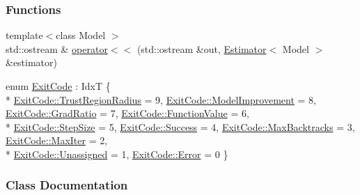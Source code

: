 \subsubsection*{Functions}
\begin{DoxyCompactItemize}
\item 
{\footnotesize template$<$class Model $>$ }\\std\+::ostream \& \hyperlink{namespacemappel_1_1estimator_a8267d0998b3d27a8c40bf1fe9227113d}{operator$<$$<$} (std\+::ostream \&out, \hyperlink{classmappel_1_1estimator_1_1Estimator}{Estimator}$<$ Model $>$ \&estimator)
\end{DoxyCompactItemize}
\begin{DoxyCompactItemize}
\item 
enum \hyperlink{namespacemappel_1_1estimator_ae49999202b8a1968bc308aa30ac24e6c}{Exit\+Code} \+: IdxT \{ \\*
\hyperlink{namespacemappel_1_1estimator_ae49999202b8a1968bc308aa30ac24e6caadd208e6fbd6ef5ab84a287f259c3b81}{Exit\+Code\+::\+Trust\+Region\+Radius} = 9, 
\hyperlink{namespacemappel_1_1estimator_ae49999202b8a1968bc308aa30ac24e6ca9b80f9b9e1c1cf4247c1d5d6edc7c3f8}{Exit\+Code\+::\+Model\+Improvement} = 8, 
\hyperlink{namespacemappel_1_1estimator_ae49999202b8a1968bc308aa30ac24e6ca8d0cc41d71102a7952fefe3c63244fd4}{Exit\+Code\+::\+Grad\+Ratio} = 7, 
\hyperlink{namespacemappel_1_1estimator_ae49999202b8a1968bc308aa30ac24e6ca400823530aeaf00ddf2b69458acdc235}{Exit\+Code\+::\+Function\+Value} = 6, 
\\*
\hyperlink{namespacemappel_1_1estimator_ae49999202b8a1968bc308aa30ac24e6ca071449462d0c247e47313eb8c3129dd0}{Exit\+Code\+::\+Step\+Size} = 5, 
\hyperlink{namespacemappel_1_1estimator_ae49999202b8a1968bc308aa30ac24e6ca505a83f220c02df2f85c3810cd9ceb38}{Exit\+Code\+::\+Success} = 4, 
\hyperlink{namespacemappel_1_1estimator_ae49999202b8a1968bc308aa30ac24e6ca9e5d3183756d69b44432394db6b6fd86}{Exit\+Code\+::\+Max\+Backtracks} = 3, 
\hyperlink{namespacemappel_1_1estimator_ae49999202b8a1968bc308aa30ac24e6cabbf52264f7a6e91c48a242f95aeed3db}{Exit\+Code\+::\+Max\+Iter} = 2, 
\\*
\hyperlink{namespacemappel_1_1estimator_ae49999202b8a1968bc308aa30ac24e6ca3476bf9c3af766198bfbd4f065a51e69}{Exit\+Code\+::\+Unassigned} = 1, 
\hyperlink{namespacemappel_1_1estimator_ae49999202b8a1968bc308aa30ac24e6ca902b0d55fddef6f8d651fe1035b7d4bd}{Exit\+Code\+::\+Error} = 0
 \}
\end{DoxyCompactItemize}


\subsubsection{Class Documentation}
\label{structmappel_1_1estimator_1_1MLEData}
\hypertarget{namespacemappel_1_1estimator_structmappel_1_1estimator_1_1MLEData}{}

